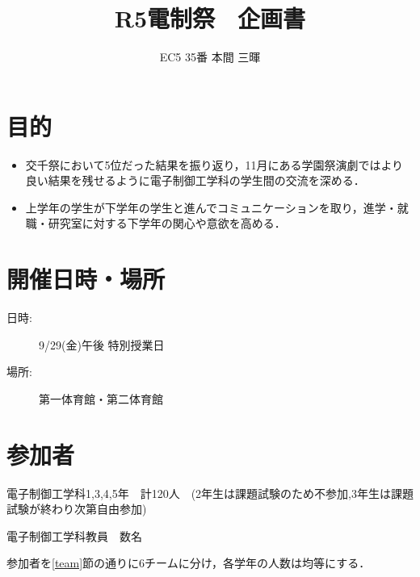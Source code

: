 \documentclass[dvipdfmx]{jsarticle}
\begin{document}
\title{R5電制祭　企画書}
\author{EC5 35番 本間 三暉}
\maketitle

\section{目的}
\begin{itemize}
  \item 交千祭において5位だった結果を振り返り，11月にある学園祭演劇ではより良い結果を残せるように電子制御工学科の学生間の交流を深める．
  \item 上学年の学生が下学年の学生と進んでコミュニケーションを取り，進学・就職・研究室に対する下学年の関心や意欲を高める．
\end{itemize}

\section{開催日時・場所}
\begin{description}
  \item[日時:] 9/29(金)午後 特別授業日
  \item[場所:] 第一体育館・第二体育館
\end{description}
\section{参加者}
電子制御工学科1,3,4,5年　計120人　(2年生は課題試験のため不参加,3年生は課題試験が終わり次第自由参加)

電子制御工学科教員　数名


参加者を\ref{team}節の通りに6チームに分け，各学年の人数は均等にする．
\end{document}
